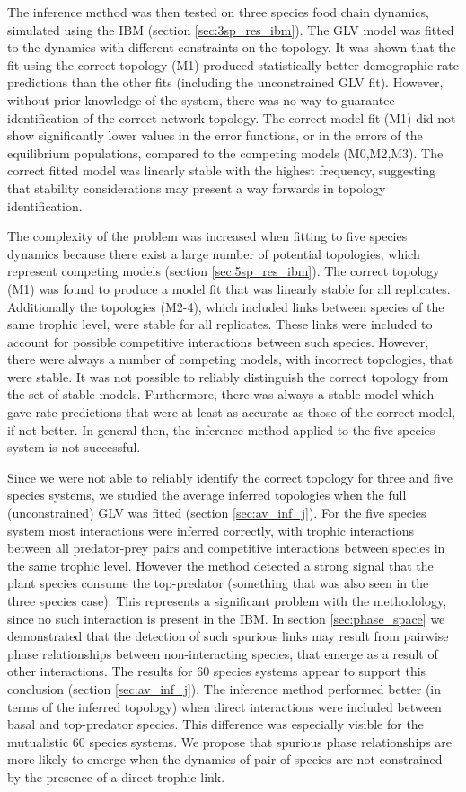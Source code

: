 The inference method was then tested on three species food chain dynamics, simulated using the IBM (section \ref{sec:3sp_res_ibm}). The GLV model was fitted to the dynamics with different constraints on the topology. It was shown that the fit using the correct topology (M1) produced statistically better demographic rate predictions than the other fits (including the unconstrained GLV fit). However, without prior knowledge of the system, there was no way to guarantee identification of the correct network topology. The correct model fit (M1) did not show significantly lower values in the error functions, or in the errors of the equilibrium populations, compared to the competing models (M0,M2,M3). The correct fitted model was linearly stable with the highest frequency, suggesting that stability considerations may present a way forwards in topology identification.

The complexity of the problem was increased when fitting to five species dynamics because there exist a large number of potential topologies, which represent competing models (section \ref{sec:5sp_res_ibm}). The correct topology (M1) was found to produce a model fit that was linearly stable for all replicates. Additionally the topologies (M2-4), which included links between species of the same trophic level, were stable for all replicates. These links were included to account for possible competitive interactions between such species. However, there were always a number of competing models, with incorrect topologies, that were stable. It was not possible to reliably distinguish the correct topology from the set of stable models. Furthermore, there was always a stable model which gave rate predictions that were at least as accurate as those of the correct model, if not better. In general then, the inference method applied to the five species system is not successful. 

Since we were not able to reliably identify the correct topology for three and five species systems, we studied the average inferred topologies when the full (unconstrained) GLV was fitted (section \ref{sec:av_inf_j}). For the five species system most interactions were inferred correctly, with trophic interactions between all predator-prey pairs and competitive interactions between species in the same trophic level. However the method detected a strong signal that the plant species consume the top-predator (something that was also seen in the three species case). This represents a significant problem with the methodology, since no such interaction is present in the IBM. In section \ref{sec:phase_space} we demonstrated that the detection of such spurious links may result from pairwise phase relationships between non-interacting species, that emerge as a result of other interactions. The results for 60 species systems appear to support this conclusion (section \ref{sec:av_inf_j}). The inference method performed better (in terms of the inferred topology) when direct interactions were included between basal and top-predator species. This difference was especially visible for the mutualistic 60 species systems. We propose that spurious phase relationships are more likely to emerge when the dynamics of pair of species are not constrained by the presence of a direct trophic link.

